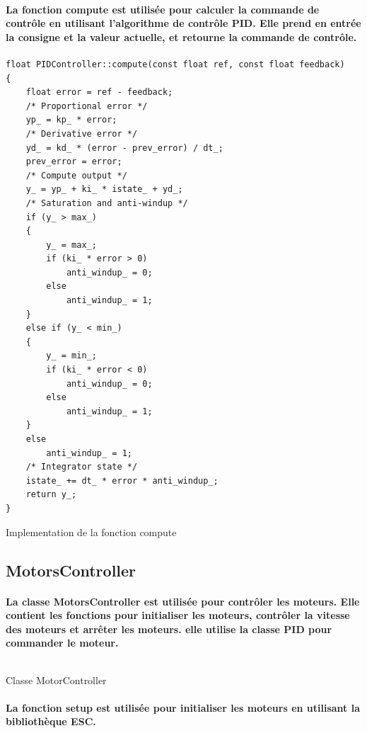 \paragraph{La fonction \textbf{compute} est utilisée pour calculer la commande de contrôle en utilisant l'algorithme de contrôle PID. Elle prend en entrée la consigne et la valeur actuelle, et retourne la commande de contrôle.}
\newpage

\begin{listing}[!htpb]
	\begin{verbatim}
float PIDController::compute(const float ref, const float feedback)
{
	float error = ref - feedback;
	/* Proportional error */
	yp_ = kp_ * error;
	/* Derivative error */
	yd_ = kd_ * (error - prev_error) / dt_;
	prev_error = error;
	/* Compute output */
	y_ = yp_ + ki_ * istate_ + yd_;
	/* Saturation and anti-windup */
	if (y_ > max_)
	{
		y_ = max_;
		if (ki_ * error > 0)
			anti_windup_ = 0;
		else
			anti_windup_ = 1;
	}
	else if (y_ < min_)
	{
		y_ = min_;
		if (ki_ * error < 0)
			anti_windup_ = 0;
		else
			anti_windup_ = 1;
	}
	else
		anti_windup_ = 1;
	/* Integrator state */
	istate_ += dt_ * error * anti_windup_;
	return y_;
}
	\end{verbatim}
	\caption{Implementation de la fonction compute}
	\label{listing:pid-compute}
\end{listing}

\subsection{MotorsController}

\paragraph{La classe MotorsController est utilisée pour contrôler les moteurs. Elle contient les fonctions pour initialiser les moteurs, contrôler la vitesse des moteurs et arrêter les moteurs. elle utilise la classe PID pour commander le moteur.}
\newpage

\begin{listing}[!htpb]
	\inputminted{cpp}{Code/MotorsController.h}
	\caption{Classe MotorController}
	\label{listing:motor-controller}
\end{listing}

\paragraph{La fonction setup est utilisée pour initialiser les moteurs en utilisant la bibliothèque ESC.}


